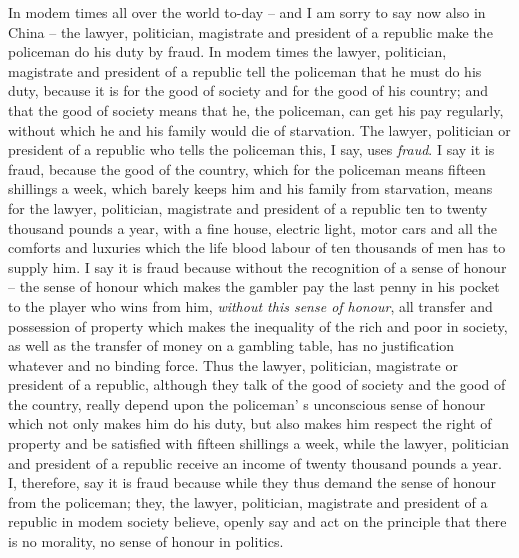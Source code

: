 In modem times all over the world to-day -- and I am sorry to say now also in China -- the lawyer, politician, magistrate and president of a republic make the policeman do his duty by fraud. In modem times the lawyer, politician, magistrate and president of a republic tell the policeman that he must do his duty, because it is for the good of society and for the good of his country; and that the good of society means that he, the policeman, can get his pay regularly, without which he and his family would die of starvation. The lawyer, politician or president of a republic who tells the policeman this, I say, uses \emph{fraud}. I say it is fraud, because the good of the country, which for the policeman means fifteen shillings a week, which barely keeps him and his family from starvation, means for the lawyer, politician, magistrate and president of a republic ten to twenty thousand pounds a year, with a fine house, electric light, motor cars and all the comforts and luxuries which the life blood labour of ten thousands of men has to supply him. I say it is fraud because without the recognition of a sense of honour -- the sense of honour which makes the gambler pay the last penny in his pocket to the player who wins from him, \emph{without this sense of honour}, all transfer and possession of property which makes the inequality of the rich and poor in society, as well as the transfer of money on a gambling table, has no justification whatever and no binding force. Thus the lawyer, politician, magistrate or president of a republic, although they talk of the good of society and the good of the country, really depend upon the policeman' s unconscious sense of honour which not only makes him do his duty, but also makes him respect the right of property and be satisfied with fifteen shillings a week, while the lawyer, politician and president of a republic receive an income of twenty thousand pounds a year. I, therefore, say it is fraud because while they thus demand the sense of honour from the policeman; they, the lawyer, politician, magistrate and president of a republic in modem society believe, openly say and act on the principle that there is no morality, no sense of honour in politics.

